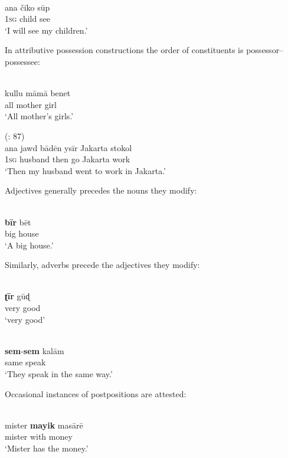 \documentclass[output=paper]{langsci/langscibook}
\begin{document}
\ex {} \citep[133]{Avram2017article}\\
\gll     ana čiko sūp\\
         1\textsc{sg} child see\\
\glt       `I will see my children.'                                        
\z                                             
\z

In attributive possession constructions the order of constituents is possessor–possessee:      

\ea
\ea {} \citep[198]{Bizri2010} \\
\gll     kullu māmā benet \\
         all mother girl    \\
\glt `All mother’s girls.'

\ex {} (\citealt{Næss2008}: 87)\\
\gll     ana jawd bādēn ysīr Jakarta stokol\\
         1\textsc{sg} husband then go Jakarta work\\
\glt       `Then my husband went to work in Jakarta.' 
\z
\z

Adjectives generally precedes the nouns they modify:

\ea
{  \citep[119]{Bizri2010}}\\
\gll   \textbf{bī}\textbf{r} bēt\\
       big house\\
\glt     `A big house.'
\z

Similarly, adverbs precede the adjectives they modify:

\ea
\ea {} \citep[119]{Bizri2010}\\
\gll     \textbf{ʈīr} gūɖ\\
         very good\\
\glt       `very good'

\ex
{} \citep[25]{Avram2014Pidgin}\\
\gll     \textbf{sem}-\textbf{sem} kalām\\
         same speak \\
\glt       `They speak in the same way.'
 \z
 \z

  Occasional instances of postpositions are attested:
  
\ea
\ea {} \citep[132]{Bizri2010}\\
\gll     mister \textbf{mayik} masārē\\
         mister with money\\
\glt    `Mister has the money.'
\end{document}
